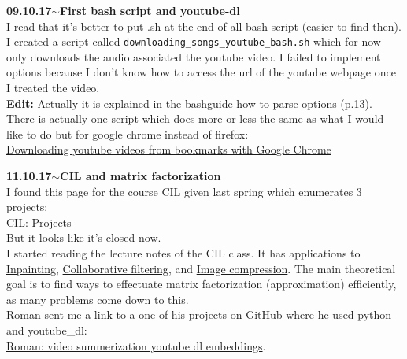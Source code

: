 \documentclass[11pt,a4paper]{article}
\newenvironment{loggentry}[2]%
{\noindent\textbf{#1}\hspace{1cm}$\mathbf{\sim}$\text{ }\textbf{#2}\\}{\vspace{0.5cm}}
\begin{document}
\begin{loggentry}{09.10.17}{First bash script and youtube-dl}
I read that it's better to put .sh at the end of all bash script (easier to find then).\\
I created a script called \texttt{downloading\_songs\_youtube\_bash.sh} which for now only downloads the audio associated the youtube video. I failed to implement options because I don't know how to access the url of the youtube webpage once I treated the video.\\
\textbf{Edit:} Actually it is explained in the bashguide how to parse options (p.13).\\
There is actually one script which does more or less the same as what I would like to do but for google chrome instead of firefox:\\
\href{http://brezular.com/2017/08/12/downloading-youtube-videos-from-links-saved-in-google-chrome-bookmarks/}{Downloading youtube videos from bookmarks with Google Chrome}\\
\end{loggentry}

\begin{loggentry}{11.10.17}{CIL and matrix factorization}
I found this page for the course CIL given last spring which enumerates 3 projects:\\
\href{http://da.inf.ethz.ch/teaching/2017/CIL/project.php}{CIL: Projects}\\
But it looks like it's closed now.\\
I started reading the lecture notes of the CIL class. It has applications to \href{https://en.wikipedia.org/wiki/Inpainting}{Inpainting}, \href{https://en.wikipedia.org/wiki/Collaborative_filtering}{Collaborative filtering}, and \href{https://en.wikipedia.org/wiki/Image_compression}{Image compression}. The main theoretical goal is to find ways to effectuate matrix factorization (approximation) efficiently, as many problems come down to this.\\
Roman sent me a link to a one of his projects on GitHub where he used python and youtube\_dl:\\
\href{http://nbviewer.jupyter.org/github/rlyapin/video_summarization/blob/master/video_summarization_with_dl_embeddings_%28part_II%29.ipynb}{Roman: video summerization youtube dl embeddings}.
\end{loggentry}
\end{document}
